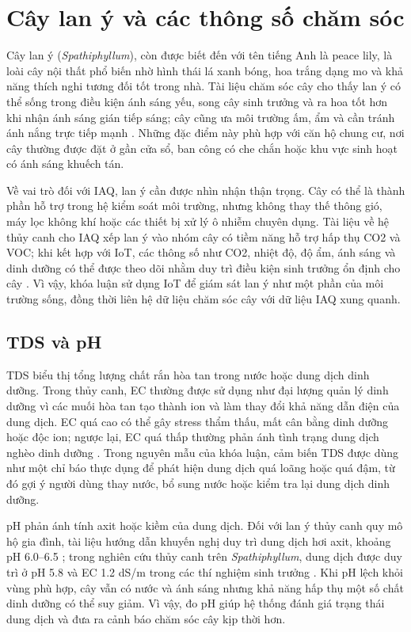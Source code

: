 \section{Cây lan ý và các thông số chăm sóc}
Cây lan ý (\textit{Spathiphyllum}), còn được biết đến với tên tiếng Anh là peace lily, là loài cây nội thất phổ biến nhờ hình thái lá xanh bóng, hoa trắng dạng mo và khả năng thích nghi tương đối tốt trong nhà. Tài liệu chăm sóc cây cho thấy lan ý có thể sống trong điều kiện ánh sáng yếu, song cây sinh trưởng và ra hoa tốt hơn khi nhận ánh sáng gián tiếp sáng; cây cũng ưa môi trường ấm, ẩm và cần tránh ánh nắng trực tiếp mạnh \cite{peace_lily_care_bhg}. Những đặc điểm này phù hợp với căn hộ chung cư, nơi cây thường được đặt ở gần cửa sổ, ban công có che chắn hoặc khu vực sinh hoạt có ánh sáng khuếch tán.

Về vai trò đối với IAQ, lan ý cần được nhìn nhận thận trọng. Cây có thể là thành phần hỗ trợ trong hệ kiểm soát môi trường, nhưng không thay thế thông gió, máy lọc không khí hoặc các thiết bị xử lý ô nhiễm chuyên dụng. Tài liệu về hệ thủy canh cho IAQ xếp lan ý vào nhóm cây có tiềm năng hỗ trợ hấp thụ CO2 và VOC; khi kết hợp với IoT, các thông số như CO2, nhiệt độ, độ ẩm, ánh sáng và dinh dưỡng có thể được theo dõi nhằm duy trì điều kiện sinh trưởng ổn định cho cây \cite{hydroponic_iaq_survey}. Vì vậy, khóa luận sử dụng IoT để giám sát lan ý như một phần của môi trường sống, đồng thời liên hệ dữ liệu chăm sóc cây với dữ liệu IAQ xung quanh.

\subsection{TDS và pH}
TDS biểu thị tổng lượng chất rắn hòa tan trong nước hoặc dung dịch dinh dưỡng. Trong thủy canh, EC thường được sử dụng như đại lượng quản lý dinh dưỡng vì các muối hòa tan tạo thành ion và làm thay đổi khả năng dẫn điện của dung dịch. EC quá cao có thể gây stress thẩm thấu, mất cân bằng dinh dưỡng hoặc độc ion; ngược lại, EC quá thấp thường phản ánh tình trạng dung dịch nghèo dinh dưỡng \cite{singh_hydroponics_ph_ec}. Trong nguyên mẫu của khóa luận, cảm biến TDS được dùng như một chỉ báo thực dụng để phát hiện dung dịch quá loãng hoặc quá đậm, từ đó gợi ý người dùng thay nước, bổ sung nước hoặc kiểm tra lại dung dịch dinh dưỡng.

pH phản ánh tính axit hoặc kiềm của dung dịch. Đối với lan ý thủy canh quy mô hộ gia đình, tài liệu hướng dẫn khuyến nghị duy trì dung dịch hơi axit, khoảng pH 6.0--6.5 \cite{peace_lily_hydro_brightlane}; trong nghiên cứu thủy canh trên \textit{Spathiphyllum}, dung dịch được duy trì ở pH 5.8 và EC 1.2 dS/m trong các thí nghiệm sinh trưởng \cite{peace_lily_ec_ppf}. Khi pH lệch khỏi vùng phù hợp, cây vẫn có nước và ánh sáng nhưng khả năng hấp thụ một số chất dinh dưỡng có thể suy giảm. Vì vậy, đo pH giúp hệ thống đánh giá trạng thái dung dịch và đưa ra cảnh báo chăm sóc cây kịp thời hơn.

